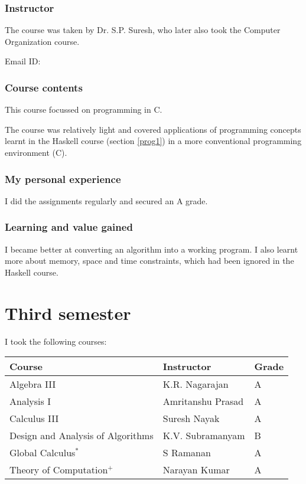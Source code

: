 \documentclass[a4paper]{amsart}
\begin{document}
\subsubsection{Instructor}

The course was taken by Dr. S.P. Suresh, who later also took the Computer Organization course.

Email ID: 

\subsubsection{Course contents}

This course focussed on programming in C.

The course was relatively light and covered applications of 
programming concepts learnt in the Haskell 
course (section \ref{prog1}) in a more conventional programming environment (C). 

\subsubsection{My personal experience}

I did the assignments regularly and secured an A grade.

\subsubsection{Learning and  value gained}

I became better at converting an algorithm into a working program. I
also learnt more about memory, space and time constraints, which had
been ignored in the Haskell course.


\section{Third semester}

I took the following courses:

\begin{tabular}{|l|l|l|}
  \hline
  Course & Instructor & Grade \\
  \hline
  Algebra III & K.R. Nagarajan & A\\
  Analysis I & Amritanshu Prasad & A\\
  Calculus III& Suresh Nayak & A\\
  Design and Analysis of Algorithms & K.V. Subramanyam & B\\
  Global Calculus$^*$ & S Ramanan & A\\
  Theory of Computation$^+$ & Narayan Kumar & A\\
  \hline
\end{tabular}
\end{document}
